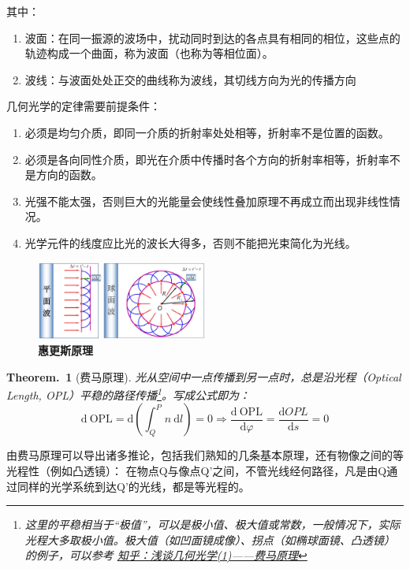 \documentclass[UTF8]{report}
\theoremstyle{MyLineTheoremStyle} %
\theoremstyle{MyBlockTheoremStyle} %
\newtheorem{BlockTheorem}[LineTheorem]{Theorem.\,} %
\theoremstyle{MySubsubsectionStyle} %
\begin{document}
\noindent 其中：
\begin{enumerate}
    \item 波面：在同一振源的波场中，扰动同时到达的各点具有相同的相位，这些点的轨迹构成一个曲面，称为波面（也称为等相位面）。
    \item 波线：与波面处处正交的曲线称为波线，其切线方向为光的传播方向
\end{enumerate}

\noindent 几何光学的定律需要前提条件：
\begin{enumerate}
\item 必须是均匀介质，即同一介质的折射率处处相等，折射率不是位置的函数。
\item 必须是各向同性介质，即光在介质中传播时各个方向的折射率相等，折射率不是方向的函数。
\item 光强不能太强，否则巨大的光能量会使线性叠加原理不再成立而出现非线性情况。
\item 光学元件的线度应比光的波长大得多，否则不能把光束简化为光线。
\end{enumerate}

\begin{figure}[H]\centering
\includegraphics[width=0.5\textwidth]{assets/1,2/image (46).jpg}
\caption{\textbf{惠更斯原理}}\label{惠更斯原理}
\end{figure}

\begin{BlockTheorem}[费马原理]\label{费马原理}
光从空间中一点传播到另一点时，总是沿光程（Optical Length, OPL）平稳的路径传播\footnote{这里的平稳相当于“极值”，可以是极小值、极大值或常数，一般情况下，实际光程大多取极小值。极大值（如凹面镜成像）、拐点（如椭球面镜、凸透镜）的例子，可以参考 \href{https://zhuanlan.zhihu.com/p/107739173}{知乎：浅谈几何光学(1)——费马原理}}。写成公式即为：
\begin{equation}
    \mathrm{d}\ \mathrm{OPL} =  \mathrm{d}\left(\int_{Q}^{P} n \ \mathrm{d} l\right)=0 \Longrightarrow \frac{\mathrm{d}\  \mathrm{OPL} }{\mathrm{d} \varphi } = \frac{\mathrm{d} OPL }{\mathrm{d} s } = 0 
\end{equation}
\end{BlockTheorem}
由费马原理可以导出诸多推论，包括我们熟知的几条基本原理，还有物像之间的等光程性（例如凸透镜）：
在物点Q与像点Q’之间，不管光线经何路径，凡是由Q通过同样的光学系统到达Q’的光线，都是等光程的。
\end{document}
